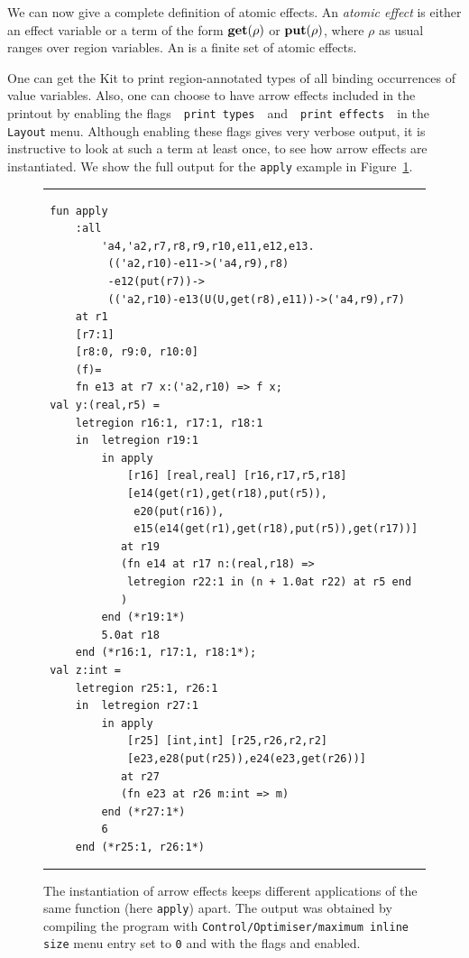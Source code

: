 \documentclass[12pt]{book}
\begin{document}
We can now give a complete definition of atomic effects. 
An 
%
{\em atomic effect\/} is either an effect
variable or a term of the form $\mathop{\bf get}\nolimits(\rho)$ or $\mathop{\bf put}\nolimits(\rho)$, where $\rho$ as usual ranges over region
variables. An  is a finite set of atomic effects.

One can get the Kit to print region-annotated 
%
%
types of all binding occurrences of value variables.  Also, one can 
choose to have arrow effects included in the printout by enabling 
the flags~~\texttt{print types}~~and~~\texttt{print effects}~~in the 
\texttt{Layout} menu. Although enabling these flags gives very 
verbose output, it is instructive to look at such a term at least once, to 
see how arrow effects are instantiated. We show the full output for 
the {\tt apply} example in Figure~\ref{apply.fig}. 

\begin{figure}
\hrule \medskip
\begin{verbatim} 
 fun apply 
     :all 
         'a4,'a2,r7,r8,r9,r10,e11,e12,e13.
          (('a2,r10)-e11->('a4,r9),r8)
          -e12(put(r7))->
          (('a2,r10)-e13(U(U,get(r8),e11))->('a4,r9),r7) 
     at r1 
     [r7:1] 
     [r8:0, r9:0, r10:0] 
     (f)= 
     fn e13 at r7 x:('a2,r10) => f x; 
 val y:(real,r5) = 
     letregion r16:1, r17:1, r18:1 
     in  letregion r19:1 
         in apply
             [r16] [real,real] [r16,r17,r5,r18] 
             [e14(get(r1),get(r18),put(r5)),
              e20(put(r16)),
              e15(e14(get(r1),get(r18),put(r5)),get(r17))]
            at r19 
            (fn e14 at r17 n:(real,r18) => 
             letregion r22:1 in (n + 1.0at r22) at r5 end
            ) 
         end (*r19:1*) 
         5.0at r18 
     end (*r16:1, r17:1, r18:1*); 
 val z:int = 
     letregion r25:1, r26:1 
     in  letregion r27:1 
         in apply
             [r25] [int,int] [r25,r26,r2,r2] 
             [e23,e28(put(r25)),e24(e23,get(r26))]
            at r27 
            (fn e23 at r26 m:int => m) 
         end (*r27:1*) 
         6 
     end (*r25:1, r26:1*)
\end{verbatim}
\caption{The instantiation of arrow effects keeps different applications of
  the same function (here {\tt apply}) apart. The output
  was obtained by compiling the program  with
  {\tt Control/Optimiser/maximum inline size} menu entry set to {\tt 0} and with the flags  and
   enabled.}  \medskip \hrule
\label{apply.fig}
\end{figure}
\end{document}
